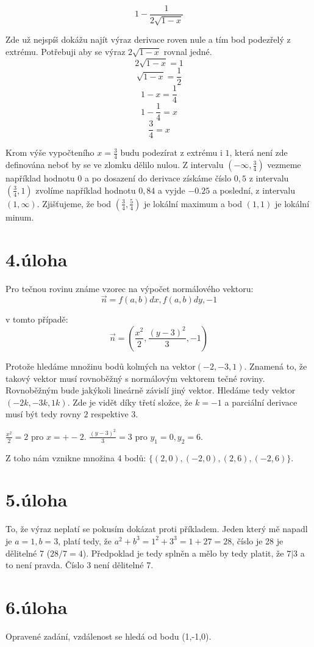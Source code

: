 \documentclass[a4paper, 11pt]{article}
\begin{document}
   $$1-\frac{1}{2\sqrt{1-x}}$$
   
   Zde už nejspíš dokážu najít výraz derivace roven nule a tím bod podezřelý z extrému. Potřebuji aby se výraz $2\sqrt{1-x}$ rovnal jedné.
   $$2\sqrt{1-x} = 1$$
   $$\sqrt{1-x} = \frac{1}{2}$$
   $$ 1-x = \frac{1}{4}$$
   $$1-\frac{1}{4} = x$$
   $$\frac{3}{4} = x$$
   
   Krom výše vypočteního $x = \frac{3}{4}$ budu podezírat z extrému  i $1$, která není zde definována nebo\v{t} by se ve zlomku dělilo nulou.
   Z intervalu $(-\infty,\frac{3}{4})$ vezmeme například hodnotu $0$ a po dosazení do derivace získáme číslo $0,5$ z intervalu $(\frac{3}{4},1)$ 
   zvolíme například hodnotu $0,84$ a vyjde $-0.25$ a poslední, z intervalu $(1,\infty)$. Zjiš\v{t}ujeme, že bod $(\frac{3}{4},\frac{5}{4})$ je lokální
   maximum a bod $(1,1)$ je lokální minum.
 
 \section*{4.úloha}
  Pro tečnou rovinu známe vzorec na výpočet normálového vektoru:
  $$\overrightarrow{n} = f(a,b)dx,f(a,b)dy,-1$$
  
  v tomto případě:
  $$\overrightarrow{n} = (\frac{x^2}{2},\frac{(y-3)^2}{3},-1)$$
  
  Protože hledáme množinu bodů kolmých na vektor$(-2,-3,1)$. Znamená to, že takový vektor musí rovnoběžný s normálovým vektorem tečné roviny. Rovnoběžným bude 
  jakýkoli lineárně závislí jiný vektor. Hledáme tedy vektor $(-2k,-3k,1k)$. Zde je vidět díky třetí složce, že $k = -1$ a parciální derivace musí být tedy
  rovny $2$ respektive $3$.
  
  $\frac{x^2}{2} = 2$ pro $x = +-2$.\newline
  $\frac{(y-3)^2}{3} = 3$ pro $y_1 = 0, y_2 = 6$.
  
  Z toho nám vznikne množina 4 bodů: $\{(2,0),(-2,0),(2,6),(-2,6)\}$.
  
  
 \section*{5.úloha}
  To, že výraz neplatí se pokusím dokázat proti příkladem. Jeden který mě napadl je $a = 1, b = 3$, platí tedy, že $a^2 + b^3 = 1^2 + 3^3 = 1 + 27 = 28$,
  číslo je 28 je dělitelné 7 ($28/7 = 4$). Předpoklad je tedy splněn a mělo by tedy platit, že $7|3$ a to není pravda. Číslo 3 není dělitelné 7.
  
 \section*{6.úloha}
  Opravené zadání, vzdálenost se hledá od bodu (1,-1,0).
  
\end{document}
